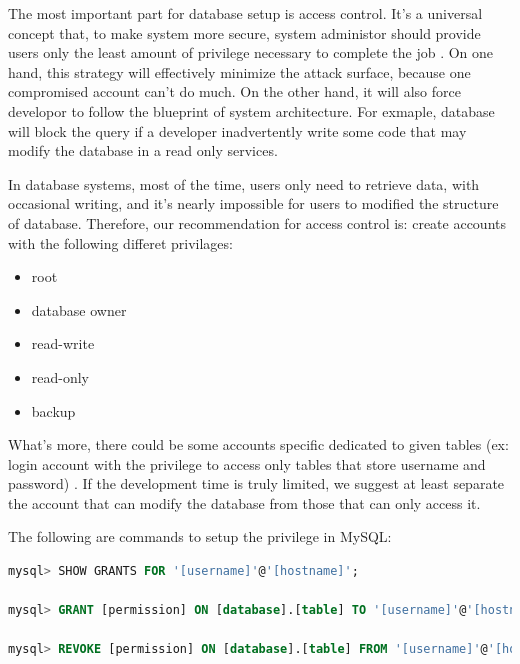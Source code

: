 \documentclass[conference]{IEEEtran}
\begin{document}
The most important part for database setup is access control.
It's a universal concept that, to make system more secure,
system administor should provide users
only the least amount of privilege necessary to complete the job \cite{least_privilege}.
On one hand,
this strategy will effectively minimize the attack surface,
because one compromised account can't do much.
On the other hand, it will also force developor to follow the blueprint of
system architecture.
For exmaple, database will block the query
if a developer inadvertently write some code
that may modify the database
in a read only services.

In database systems,
most of the time, users only need to retrieve data, with
occasional writing, and
it's nearly impossible for users to modified the structure of database.
Therefore,
our recommendation for access control is:
create accounts with the following differet privilages:
\begin{itemize}
\item
root
\item
database owner
\item
read-write
\item
read-only
\item
backup
\end{itemize}
What's more, there could be some
accounts specific dedicated to given tables (ex: login account with
the privilege to access only tables that store username and password)
\cite{MySQL_privilage}.
If the development time is truly limited, we suggest at least separate the account that
can modify the database from those that can only access it.

The following are commands to setup the privilege in MySQL:
\begin{lstlisting}[language=sql]
mysql> SHOW GRANTS FOR '[username]'@'[hostname]';

mysql> GRANT [permission] ON [database].[table] TO '[username]'@'[hostname]' IDENTIFIED BY '[password]';

mysql> REVOKE [permission] ON [database].[table] FROM '[username]'@'[hostname]';
\end{lstlisting}
\end{document}
